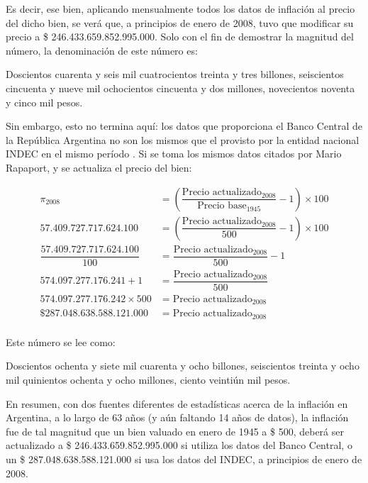 \documentclass[12pt,a4paper,twoside]{book}
\begin{document}
Es decir, ese bien, aplicando mensualmente todos los datos de inflación al precio del dicho bien, se verá que, a principios de enero de 2008, tuvo que modificar su precio a \$ 246.433.659.852.995.000. Solo con el fin de demostrar la magnitud del número, la denominación de este número es:

\begin{center}
Doscientos cuarenta y seis mil cuatrocientos treinta y tres billones, seiscientos cincuenta y nueve mil ochocientos cincuenta y dos millones, novecientos noventa y cinco mil pesos.
\end{center}

Sin embargo, esto no termina aquí: los datos que proporciona el Banco Central de la República Argentina no son los mismos que el provisto por la entidad nacional INDEC en el mismo período \cite[pág. 16]{indec-hist}. Si se toma los mismos datos citados por Mario Rapaport, y se actualiza el precio del bien:

\begin{align*}
\pi_{2008} &= \left( \dfrac{\text{Precio actualizado}_{2008}}{\text{Precio base}_{1945}} - 1 \right) \times 100 \\
57.409.727.717.624.100 &= \left( \dfrac{\text{Precio actualizado}_{2008}}{500} - 1 \right) \times 100 \\
\dfrac{57.409.727.717.624.100}{100} &= \dfrac{\text{Precio actualizado}_{2008}}{500} - 1 \\
574.097.277.176.241 + 1 &= \dfrac{\text{Precio actualizado}_{2008}}{500} \\
574.097.277.176.242 \times 500 &= \text{Precio actualizado}_{2008} \\
\text{\$ } 287.048.638.588.121.000 &= \text{Precio actualizado}_{2008} \\
\end{align*}

Este número se lee como:

\begin{center}
Doscientos ochenta y siete mil cuarenta y ocho billones, seiscientos treinta y ocho mil quinientos ochenta y ocho millones, ciento veintiún mil pesos.
\end{center}

En resumen, con dos fuentes diferentes de estadísticas acerca de la inflación en Argentina, a lo largo de 63 años (y aún faltando 14 años de datos), la inflación fue de tal magnitud que un bien valuado en enero de 1945 a \$ 500, deberá ser actualizado a \$ 246.433.659.852.995.000 si utiliza los datos del Banco Central, o un \$ 287.048.638.588.121.000 si usa los datos del INDEC, a principios de enero de 2008.
\end{document}
